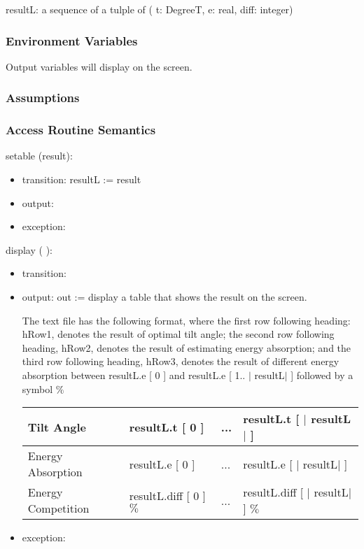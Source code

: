 \documentclass[12pt, titlepage]{article}
\begin{document}
resultL: a sequence of a tulple of ( t: DegreeT, e: real, diff: integer)\\

\subsubsection{Environment Variables}
Output variables will display on the screen.

\subsubsection{Assumptions}


\subsubsection{ Access Routine Semantics}

\noindent  setable (result):
\begin{itemize}
\item transition: resultL := result
\item output:
\item exception: 
\end{itemize}

\noindent  display ( ):
\begin{itemize}
\item transition:
\item output: out := display a table that shows the result on the screen.

The text file has the following format, where the first row following heading: hRow1, denotes the result of optimal tilt angle; the second row following heading, hRow2, denotes the result of estimating energy absorption; and the third row following heading, hRow3, denotes the result of different energy absorption between resultL.e [ 0 ] and resultL.e [ 1.. $|$ resultL$|$ ] followed by a symbol $\%$


\begin{center}
\begin{tabular}{p{4.5cm}|p{4cm}|p{1cm}|p{5cm}}

\hline 
Tilt Angle & resultL.t [ 0 ] & ...  & resultL.t [ $|$ resultL$|$ ] \\
\hline 
Energy Absorption & resultL.e [ 0 ] & ...  & resultL.e [ $|$ resultL$|$ ] \\
\hline 
Energy Competition & resultL.diff [ 0 ] $\%$    & ...     & resultL.diff [ $|$ resultL$|$ ] $\%$    \\
\hline
\end{tabular}
\end{center}

\item exception: 
\end{itemize}
\end{document}
